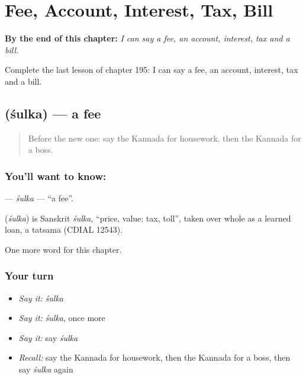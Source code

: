 
\chapter{Fee, Account, Interest, Tax, Bill}
\label{ch:ka-fee-account-interest-tax-bill}

\begin{chapteropening}
\textbf{By the end of this chapter:} \emph{I can say a fee, an account, interest, tax and a bill.}

Complete the last lesson of chapter 195: I can say a fee, an account, interest, tax and a bill.
\end{chapteropening}

\section[\texorpdfstring{\kn{ಶುಲ್ಕ} (śulka)}{ಶುಲ್ಕ (śulka)}]{ (śulka) — a fee}

\label{lesson:KA-C195-sulka}



\begin{quote}
Before the new one: say the Kannada for housework, then the Kannada for a boss.
\end{quote}

\subsection*{You'll want to know: }
\textbf{} — \emph{śulka} — \textquotedblleft{}a fee\textquotedblright{}.

\begin{cousinweb}
\textbf{} (\emph{śulka}) is Sanskrit \emph{śulka}, \textquotedblleft{}price, value; tax, toll\textquotedblright{}, taken over whole as a learned loan, a tatsama (CDIAL 12543).
\end{cousinweb}

\begin{grammarlens}[title={What you've built}]
One more word for this chapter.
\end{grammarlens}

\subsection*{Your turn}
\begin{itemize}
\raggedright
  \item \emph{Say it:} \emph{śulka}
  \item \emph{Say it:} \emph{śulka}, once more
  \item \emph{Say it:} say \emph{śulka}
  \item \emph{Recall:} say the Kannada for housework, then the Kannada for a boss, then say \emph{śulka} again
\end{itemize}

